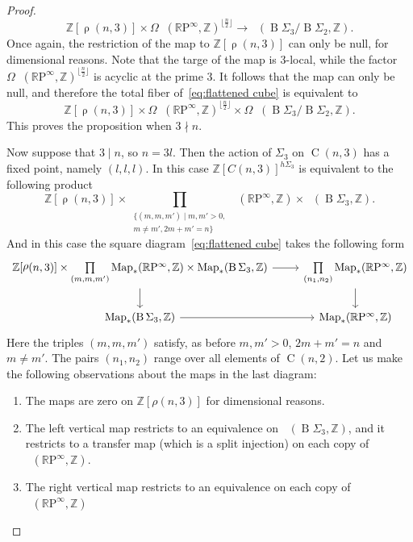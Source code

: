 \documentclass[10pt,a4paper]{amsart}
\DeclareMathOperator{\Comp}{C}
\DeclareMathOperator{\Part}{\rho}
\newcommand{\RP}{\mathbb{R}\mathrm{P}}
\newcommand{\Z}{\mathbb{Z}}
\newcommand{\classifying}{\operatorname{B}}
\DeclareMathOperator{\map}{Map}
\DeclareMathOperator{\pointedmaps}{\map_*}
\begin{document}
\begin{proof}
\[
\Z[\Part(n, 3)]\times \Omega \pointedmaps(\RP^\infty, \Z)^{\lfloor\frac{n}{2}\rfloor}\to \pointedmaps(\classifying\Sigma_3/\classifying\Sigma_2, \Z).
\]
Once again, the restriction of the map to $\Z[\Part(n, 3)]$ can only be null, for dimensional reasons. Note that the targe of the map is $3$-local, while the factor $\Omega \pointedmaps(\RP^\infty, \Z)^{\lfloor\frac{n}{2}\rfloor}$ is acyclic at the prime $3$. It follows that the map can only be null, and therefore the total fiber of~\eqref{eq:flattened cube} is equivalent to
\[
\Z[\Part(n, 3)]\times \Omega \pointedmaps(\RP^\infty, \Z)^{\lfloor\frac{n}{2}\rfloor}\times  \Omega\pointedmaps(\classifying\Sigma_3/\classifying\Sigma_2, \Z).
\]
This proves the proposition when $3\nmid n$. 

Now suppose that $3\mid n$, so $n=3l$. Then the action of $\Sigma_3$ on $\Comp(n, 3)$ has a fixed point, namely $(l,l,l)$. In this case $\Z[C(n, 3)]^{h\Sigma_3}$ is equivalent to the following product
\[
 \Z[\Part(n, 3)]\times \prod_{\begin{array}{c}{\{(m, m, m')\mid m, m'>0,} \\ {  m\ne m', 2m+m'=n\}}\end{array}}\pointedmaps (\RP^\infty,\Z)\times \pointedmaps(\classifying\Sigma_3, \Z).
\]
And in this case the square diagram~\eqref{eq:flattened cube}
takes the following form
\[
\begin{tikzcd}
\Z[\Part(n, 3)]\times \underset{(m,m,m')}{\prod}\pointedmaps (\RP^\infty,\Z)\times \pointedmaps(\classifying\Sigma_3, \Z) & {\underset{(n_1, n_2)}{\prod}\pointedmaps(\RP^\infty, \Z)}  \\
	{\pointedmaps({\classifying \Sigma_3}, \Z)} & {\pointedmaps(\RP^\infty, \Z)}
	\arrow[from=1-1, to=1-2]
	\arrow[from=1-1, to=2-1]
	\arrow[from=1-2, to=2-2]
	\arrow[from=2-1, to=2-2]
\end{tikzcd}
\]
Here the triples $(m,m,m')$ satisfy, as before $m, m'>0$, $2m+m'=n$ and $m\ne m'$. The pairs $(n_1, n_2)$ range over all elements of $\Comp(n,2)$. Let us make the following observations about the maps in the last diagram: 
\begin{enumerate}
    \item The maps are zero on $\Z[\rho(n, 3)]$ for dimensional reasons. 
    \item The left vertical map restricts to an equivalence on $\pointedmaps(\classifying\Sigma_3, \Z)$, and it restricts to a transfer map (which is a split injection) on each copy of $\pointedmaps(\RP^\infty, \Z)$. 
    \item The right vertical map restricts to an equivalence on each copy of $\pointedmaps(\RP^\infty, \Z)$ 

\end{enumerate}
\end{proof}
\end{document}
